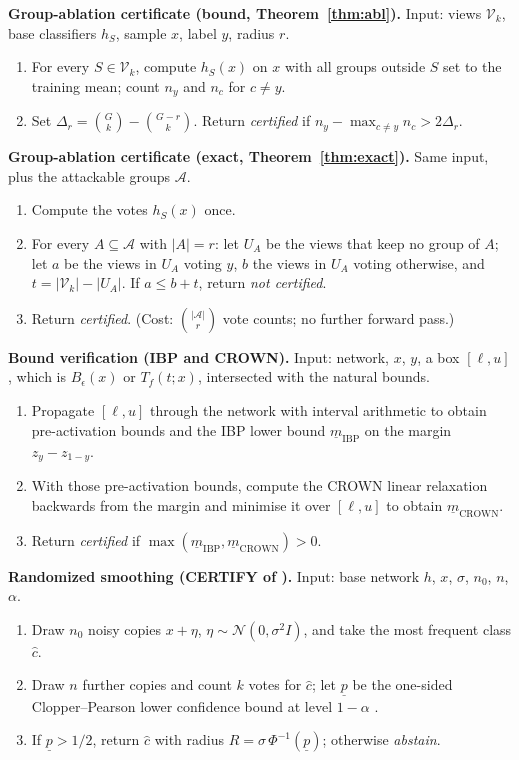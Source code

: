 \documentclass[preprint,12pt,authoryear]{elsarticle}
\begin{document}
\textbf{Group-ablation certificate (bound, Theorem~\ref{thm:abl}).} Input: views $\mathcal{V}_k$, base classifiers $h_S$, sample $x$, label $y$, radius $r$.
\begin{enumerate}
\item For every $S\in\mathcal{V}_k$, compute $h_S(x)$ on $x$ with all groups outside $S$ set to the training mean; count $n_y$ and $n_c$ for $c\neq y$.
\item Set $\Delta_r=\binom{G}{k}-\binom{G-r}{k}$. Return \emph{certified} if $n_y-\max_{c\neq y}n_c>2\Delta_r$.
\end{enumerate}
\textbf{Group-ablation certificate (exact, Theorem~\ref{thm:exact}).} Same input, plus the attackable groups $\mathcal{A}$.
\begin{enumerate}
\item Compute the votes $h_S(x)$ once.
\item For every $A\subseteq\mathcal{A}$ with $|A|=r$: let $U_A$ be the views that keep no group of $A$; let $a$ be the views in $U_A$ voting $y$, $b$ the views in $U_A$ voting otherwise, and $t=|\mathcal{V}_k|-|U_A|$. If $a\le b+t$, return \emph{not certified}.
\item Return \emph{certified}. (Cost: $\binom{|\mathcal{A}|}{r}$ vote counts; no further forward pass.)
\end{enumerate}
\textbf{Bound verification (IBP and CROWN).} Input: network, $x$, $y$, a box $[\ell,u]$, which is $B_\epsilon(x)$ or $T_f(t;x)$, intersected with the natural bounds.
\begin{enumerate}
\item Propagate $[\ell,u]$ through the network with interval arithmetic to obtain pre-activation bounds and the IBP lower bound $\underline{m}_{\text{IBP}}$ on the margin $z_y-z_{1-y}$.
\item With those pre-activation bounds, compute the CROWN linear relaxation backwards from the margin and minimise it over $[\ell,u]$ to obtain $\underline{m}_{\text{CROWN}}$.
\item Return \emph{certified} if $\max(\underline{m}_{\text{IBP}},\underline{m}_{\text{CROWN}})>0$.
\end{enumerate}
\textbf{Randomized smoothing (CERTIFY of \citet{cohen2019certified}).} Input: base network $h$, $x$, $\sigma$, $n_0$, $n$, $\alpha$.
\begin{enumerate}
\item Draw $n_0$ noisy copies $x+\eta$, $\eta\sim\mathcal{N}(0,\sigma^2I)$, and take the most frequent class $\hat c$.
\item Draw $n$ further copies and count $k$ votes for $\hat c$; let $\underline{p}$ be the one-sided Clopper--Pearson lower confidence bound at level $1-\alpha$ \citep{clopper1934}.
\item If $\underline{p}>1/2$, return $\hat c$ with radius $R=\sigma\,\Phi^{-1}(\underline{p})$; otherwise \emph{abstain}.
\end{enumerate}
\end{document}
